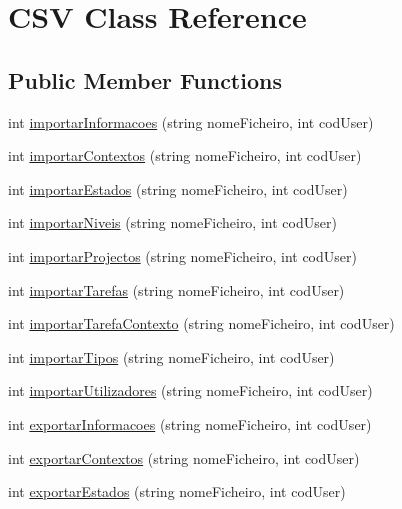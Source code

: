\hypertarget{class_c_s_v}{\section{C\-S\-V Class Reference}
\label{class_c_s_v}
}
\subsection*{Public Member Functions}
\begin{DoxyCompactItemize}
\item 
int \hyperlink{class_c_s_v_a2b7fef3b1612dbf24022badee92f3528}{importar\-Informacoes} (string nome\-Ficheiro, int cod\-User)
\item 
int \hyperlink{class_c_s_v_ade9ea5c4cc8ee38acdfa9cb6825c5330}{importar\-Contextos} (string nome\-Ficheiro, int cod\-User)
\item 
int \hyperlink{class_c_s_v_a7d62fe1893dc495105cd50bce845d267}{importar\-Estados} (string nome\-Ficheiro, int cod\-User)
\item 
int \hyperlink{class_c_s_v_a2d3974450c44af397e7e5ebd5c3c2b89}{importar\-Niveis} (string nome\-Ficheiro, int cod\-User)
\item 
int \hyperlink{class_c_s_v_a1044aed2eaffb8c39a3ab1783e95295a}{importar\-Projectos} (string nome\-Ficheiro, int cod\-User)
\item 
int \hyperlink{class_c_s_v_aa39336057cdfecd826c60d8c87dc1cb9}{importar\-Tarefas} (string nome\-Ficheiro, int cod\-User)
\item 
int \hyperlink{class_c_s_v_ab978faff3552bb342a9cb96dc2c9e203}{importar\-Tarefa\-Contexto} (string nome\-Ficheiro, int cod\-User)
\item 
int \hyperlink{class_c_s_v_ad08ae95a50c6f744874e1def484c0b36}{importar\-Tipos} (string nome\-Ficheiro, int cod\-User)
\item 
int \hyperlink{class_c_s_v_a8c8ca16b94b4dc52fe0210d16950b884}{importar\-Utilizadores} (string nome\-Ficheiro, int cod\-User)
\item 
int \hyperlink{class_c_s_v_a101ff820d37954f6a9b8718d9a09036a}{exportar\-Informacoes} (string nome\-Ficheiro, int cod\-User)
\item 
int \hyperlink{class_c_s_v_a2e8e3b25a280d8e3dd25e7c9443e38e1}{exportar\-Contextos} (string nome\-Ficheiro, int cod\-User)
\item 
int \hyperlink{class_c_s_v_ae56997c939a7f09b3efc2d67a14ba51a}{exportar\-Estados} (string nome\-Ficheiro, int cod\-User)
\item 

\end{DoxyCompactItemize}
